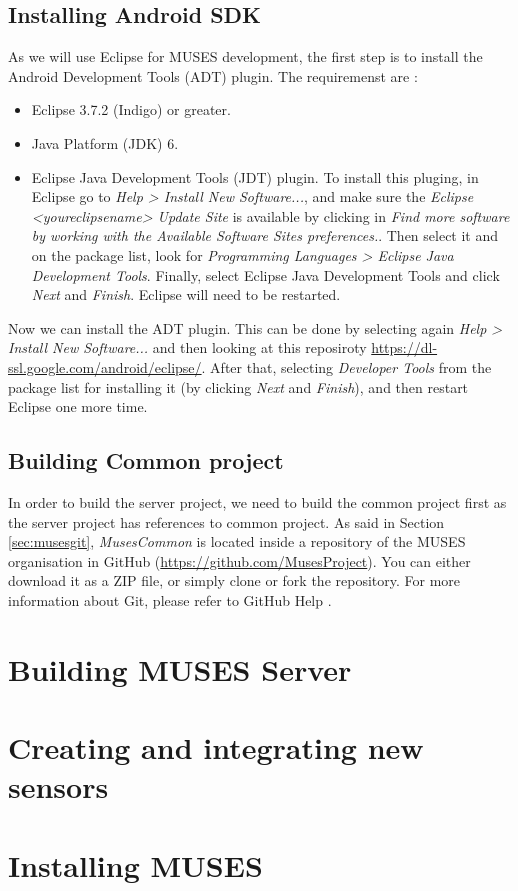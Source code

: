 \documentclass[a4paper,11pt]{book}
\begin{document}
\section{Installing Android SDK}
\label{sec:ADT}

As we will use Eclipse for MUSES development, the first step is to install the Android Development Tools (ADT) plugin. The requiremenst are \cite{adt:site}:

\begin{itemize}
  \item Eclipse 3.7.2 (Indigo) or greater.
  \item Java Platform (JDK) 6.
  \item Eclipse Java Development Tools (JDT) plugin. To install this pluging, in Eclipse go to \textit{Help > Install New Software...}, and make sure the \textit{Eclipse <youreclipsename> Update Site} is available by clicking in \textit{Find more software by working with the Available Software Sites preferences.}. Then select it and on the package list, look for \textit{Programming Languages > Eclipse Java Development Tools}. Finally, select Eclipse Java Development Tools and click \textit{Next} and \textit{Finish}. Eclipse will need to be restarted.
\end{itemize}

Now we can install the ADT plugin. This can be done by selecting again \textit{Help > Install New Software...} and then looking at this reposiroty \url{https://dl-ssl.google.com/android/eclipse/}. After that, selecting \textit{Developer Tools} from the package list for installing it (by clicking \textit{Next} and \textit{Finish}), and then restart Eclipse one more time.

\section{Building Common project}

In order to build the server project, we need to build the common project first as the server project has references to common project. As said in Section \ref{sec:musesgit}, \textit{MusesCommon} is located inside a repository of the MUSES organisation in GitHub (\url{https://github.com/MusesProject}). You can either download it as a ZIP file, or simply clone or fork the repository. For more information about Git, please refer to GitHub Help \cite{githelp:site}.

\chapter{Building MUSES Server}
\label{ch:server}


\chapter{Creating and integrating new sensors}
\label{ch:sensors}


\chapter{Installing MUSES}
\label{ch:installmuses}



\end{document}
